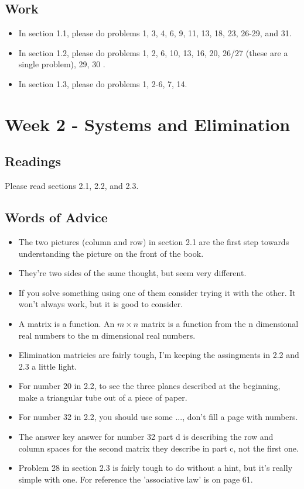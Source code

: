 	\subsection{Work}
		\begin{itemize}
			\item In section 1.1, please do problems 1, 3, 4, 6, 9, 11, 13, 18, 23, 26-29, and 31.
			\item In section 1.2, please do problems 1, 2, 6, 10, 13, 16, 20, 26/27 (these are a single problem), 29, 30 .
			\item In section 1.3, please do problems 1, 2-6, 7, 14.
		\end{itemize}

	\clearpage



	\section{Week 2 - Systems and Elimination}

	\subsection{Readings}
		Please read sections 2.1, 2.2, and 2.3.

	\subsection{Words of Advice}
		\begin{itemize}
			\item The two pictures (column and row) in section 2.1 are the first step towards understanding the picture on the front of the book.
			\item They're two sides of the same thought, but seem very different.
			\item If you solve something using one of them consider trying it with the other. It won't always work, but it is good to consider.
			\item A matrix is a function. An $m\times n$ matrix is a function from the n dimensional real numbers to the m dimensional real numbers.
			\item Elimination matricies are fairly tough, I'm keeping the assingments in 2.2 and 2.3 a little light.
			\item For number 20 in 2.2, to see the three planes described at the beginning, make a triangular tube out of a piece of paper.
			\item For number 32 in 2.2, you should use some ..., don't fill a page with numbers.
			\item The answer key answer for number 32 part d is describing the row and column spaces for the second matrix they describe in part c, not the first one.
			\item Problem 28 in section 2.3 is fairly tough to do without a hint, but it's really simple with one. For reference the 'associative law' is on page 61.
		\end{itemize}

